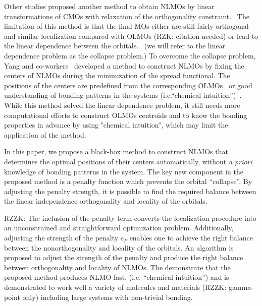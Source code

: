 \documentclass[aps,prl,reprint,amsmath,amssymb]{revtex4-1}
\begin{document}
Other studies proposed another method to obtain NLMOs by linear transformations of CMOs with relaxation of the orthogonality constraint.~\cite{feng2004An_efficient, cui2010efficient} 
The limitation of this method is that the final MOs either are still fairly orthogonal and similar localization compared with OLMOs (RZK: citation needed) or lead to the linear dependence between the orbitals.~\cite{feng2004An_efficient} (we will refer to the linear dependence problem as the collapse problem.)
To overcome the collapse problem, Yang and co-workers~\cite{feng2004An_efficient, cui2010efficient}  developed a method to construct NLMOs by fixing the centers of NLMOs during the minimization of the spread functional. 
The positions of the centers are predefined from the corresponding OLMOs~\cite{feng2004An_efficient} or good understanding of bonding patterns in the systems (i.e.``chemical intuition'')~\cite{cui2010efficient}.
While this method solved the linear dependence problem, it still needs more computational efforts to construct OLMOs centroids and to know the bonding properties in advance by using "chemical intuition", which may limit the application of the method.


In this paper, we propose a black-box method to construct NLMOs that determines the optimal positions of their centers automatically, without \emph{a priori} knowledge of bonding patterns in the system. 
The key new component in the proposed method is a penalty function which prevents the orbital ``collapse''. 
By adjusting the penalty strength, it is possible to find the required balance between the linear independence orthogonality and locality of the orbitals.

RZZK: The inclusion of the penalty term converts the localization procedure into an unconstrained and straightforward optimization problem. Additionally, adjusting the strength of the penalty $c_P$ enables one to achieve the right balance between the nonorthogonality and locality of the orbitals. 
An algorithm is proposed to adjust the strength of the penalty and produce the right balance between orthogonality and locality of NLMOs. 
The demonstrate that the proposed method produces NLMO fast,  (i.e. ``chemical intuition'') and is demonstrated to work well a variety of molecules and materials (RZZK: gamma-point only) including large systems with non-trivial bonding. 
\end{document}

